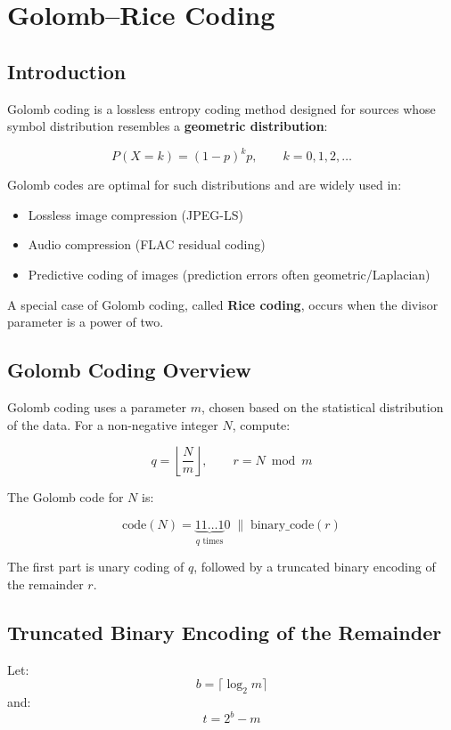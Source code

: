 \documentclass{AnantDocumentation}
\begin{document}
\section{Golomb--Rice Coding}

\subsection{Introduction}

Golomb coding is a lossless entropy coding method designed for sources whose symbol distribution resembles a \textbf{geometric distribution}:

\[
P(X = k) = (1-p)^k p, \qquad k = 0,1,2,\ldots
\]

Golomb codes are optimal for such distributions and are widely used in:

\begin{itemize}
\item Lossless image compression (JPEG-LS)
\item Audio compression (FLAC residual coding)
\item Predictive coding of images (prediction errors often geometric/Laplacian)
\end{itemize}

A special case of Golomb coding, called \textbf{Rice coding}, occurs when the divisor parameter is a power of two.

\subsection{Golomb Coding Overview}

Golomb coding uses a parameter \(m\), chosen based on the statistical distribution of the data.  
For a non-negative integer \(N\), compute:

\[
q = \left\lfloor \frac{N}{m} \right\rfloor, \qquad r = N \bmod m
\]

The Golomb code for \(N\) is:

\[
\text{code}(N) = \underbrace{11\ldots1}_{q \text{ times}}0 \; \| \; \text{binary\_code}(r)
\]

The first part is unary coding of \(q\), followed by a truncated binary encoding of the remainder \(r\).

\subsection{Truncated Binary Encoding of the Remainder}

Let:
\[
b = \lceil \log_2 m \rceil
\]
and:
\[
t = 2^b - m
\]
\end{document}
